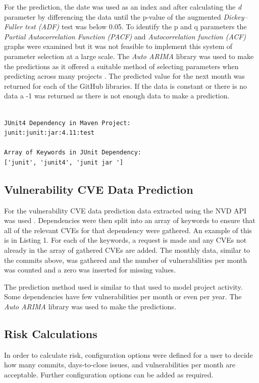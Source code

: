 \documentclass[conference]{IEEEtran}
\begin{document}
For the prediction, the date was used as an index and after calculating the \textit{d} parameter by differencing the data until the p-value of the augmented \textit{Dickey–Fuller test (ADF)} test was below 0.05. To identify the p and q parameters the \textit{Partial Autocorrelation Function (PACF)} and \textit{Autocorrelation function (ACF)} graphs were examined but it was not feasible to implement this system of parameter selection at a large scale. The \textit{Auto ARIMA} library was used to make the predictions as it offered a suitable method of selecting parameters when predicting across many projects \cite{noauthor_pmdarima_nodate}. The predicted value for the next month was returned for each of the GitHub libraries. If the data is constant or there is no data a -1 was returned as there is not enough data to make a prediction. 

\begin{lstlisting}[caption=Example Keywords]

JUnit4 Dependency in Maven Project:
junit:junit:jar:4.11:test

Array of Keywords in JUnit Dependency:
['junit', 'junit4', 'junit jar ']

\end{lstlisting}

\subsection{Vulnerability CVE Data Prediction}
For the vulnerability CVE data prediction data extracted using the NVD API was used \cite{noauthor_vulnerability_nodate}. Dependencies were then split into an array of keywords to ensure that all of the relevant CVEs for that dependency were gathered. An example of this is in Listing 1. For each of the keywords, a request is made and any CVEs not already in the array of gathered CVEs are added. The monthly data, similar to the commits above, was gathered and the number of vulnerabilities per month was counted and a zero was inserted for missing values. 

The prediction method used is similar to that used to model project activity. Some dependencies have few vulnerabilities per month or even per year. The \textit{Auto ARIMA} library was used to make the predictions. 

\subsection{Risk Calculations}
In order to calculate  risk, configuration options were defined for a user to decide how many commits, days-to-close issues, and vulnerabilities per month are acceptable. Further configuration options can be added as required. 
\end{document}
